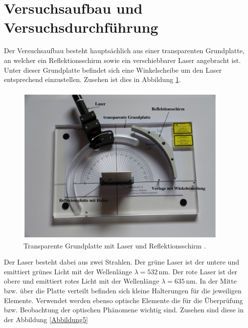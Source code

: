 \section{Versuchsaufbau und Versuchsdurchführung}

\begin{flushleft}
    Der Versuchsaufbau besteht hauptsächlich aus einer transparenten Grundplatte, an welcher ein Reflektionsschirm sowie ein verschiebbarer Laser angebracht ist.
    Unter dieser Grundplatte befindet sich eine Winkelscheibe um den Laser entsprechend einzustellen.
    Zusehen ist dies in Abbildung \ref{Abbildung4}.
\end{flushleft}

\begin{figure}[H]
    \centering
    \includegraphics[height=80mm]{bilder/Ab4.png}
    \caption{Transparente Grundplatte mit Laser und Reflektionsschirm \cite{a1}.\label{Abbildung4} }
\end{figure}

\begin{flushleft}
    Der Laser besteht dabei aus zwei Strahlen.
    Der grüne Laser ist der untere und emittiert grünes Licht mit der Wellenlänge $\lambda = 532\,\unit{\nano\meter}$.
    Der rote Laser ist der obere und emittiert rotes Licht mit der Wellenlänge $\lambda = 635\,\unit{\nano\meter}$.
    In der Mitte bzw. über die Platte verteilt befinden sich kleine Halterungen für die jeweiligen Elemente.
    Verwendet werden ebenso optische Elemente die für die Überprüfung bzw. Beobachtung der optischen Phänomene wichtig sind.
    Zusehen sind diese in der Abbildung \ref{Abbildung5}
\end{flushleft}

